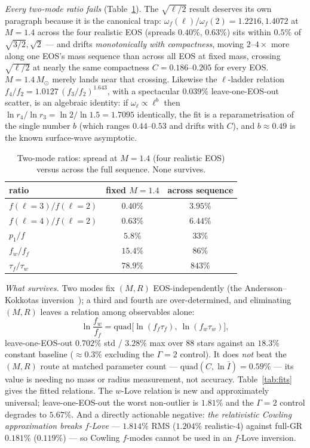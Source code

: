 \documentclass[aps,prd,preprint,amsmath,amssymb,nofootinbib,longbibliography]{revtex4-2}
\newcommand{\Msun}{M_\odot}
\begin{document}
\emph{Every two-mode ratio fails} (Table~\ref{tab:ratios}). The $\sqrt{\ell/2}$ result deserves its
own paragraph because it is the canonical trap: $\omega_f(\ell)/\omega_f(2) = 1.2216, 1.4072$ at
$M=1.4$ across the four realistic EOS (spreads $0.40\%$, $0.63\%$) sits within $0.5\%$ of
$\sqrt{3/2}, \sqrt{2}$ --- and drifts \emph{monotonically with compactness}, moving $2$--$4\times$
more along one EOS's mass sequence than across all EOS at fixed mass, crossing $\sqrt{\ell/2}$ at
nearly the same compactness $C = 0.186$--$0.205$ for every EOS. $M = 1.4\,\Msun$ merely lands near
that crossing. Likewise the $\ell$-ladder relation $f_4/f_2 = 1.0127\,(f_3/f_2)^{1.643}$, with a
spectacular $0.039\%$ leave-one-EOS-out scatter, is an algebraic identity: if
$\omega_\ell\propto\ell^b$ then $\ln r_4/\ln r_3 = \ln2/\ln1.5 = 1.7095$ identically, the fit is a
reparametrisation of the single number $b$ (which ranges $0.44$--$0.53$ and drifts with $C$),
and $b\approx0.49$ is the known surface-wave asymptotic.

\begin{table}[htbp]
\caption{Two-mode ratios: spread at $M=1.4$ (four realistic EOS) versus across the full
sequence. None survives.}
\label{tab:ratios}
\begin{ruledtabular}
\begin{tabular}{lcc}
ratio & fixed $M=1.4$ & across sequence\\
\hline
$f(\ell{=}3)/f(\ell{=}2)$ & $0.40\%$ & $3.95\%$\\
$f(\ell{=}4)/f(\ell{=}2)$ & $0.63\%$ & $6.44\%$\\
$p_1/f$ & $5.8\%$ & $33\%$\\
$f_w/f_f$ & $15.4\%$ & $86\%$\\
$\tau_f/\tau_w$ & $78.9\%$ & $843\%$\\
\end{tabular}
\end{ruledtabular}
\end{table}

\emph{What survives.} Two modes fix $(M,R)$ EOS-independently (the Andersson--Kokkotas
inversion~\cite{AK1998}); a third and fourth are over-determined, and eliminating $(M,R)$ leaves a
relation among observables alone:
\begin{equation}
\ln\frac{f_w}{f_f} = \mathrm{quad}\big[\ln(f_f\tau_f),\ \ln(f_w\tau_w)\big],
\label{eq:4obs}
\end{equation}
leave-one-EOS-out $0.702\%$ std / $3.28\%$ max over 88 stars against an $18.3\%$ constant baseline
($\approx0.3\%$ excluding the $\Gamma=2$ control). It does \emph{not} beat the $(M,R)$ route at
matched parameter count --- $\mathrm{quad}(C,\ln\bar I) = 0.59\%$ --- its value is needing no mass
or radius measurement, not accuracy. Table~\ref{tab:fits} gives the fitted relations. The
$w$-Love relation is new and approximately universal; leave-one-EOS-out the worst non-outlier is
$1.81\%$ and the $\Gamma=2$ control degrades to $5.67\%$. And a directly actionable negative:
\emph{the relativistic Cowling approximation breaks $f$-Love} --- $1.814\%$ RMS ($1.204\%$
realistic-4) against full-GR $0.181\%$ ($0.119\%$) --- so Cowling $f$-modes cannot be used in an
$f$-Love inversion.
\end{document}
